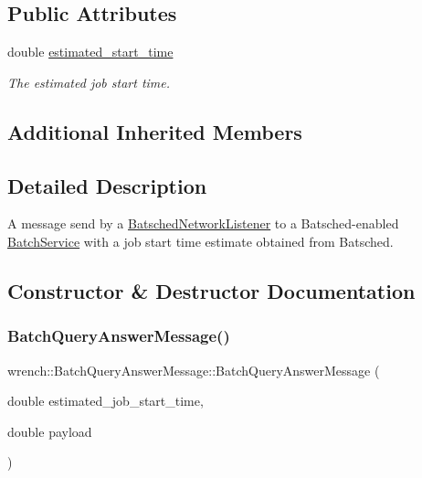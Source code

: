 \subsection*{Public Attributes}
\begin{DoxyCompactItemize}
\item 
\mbox{\label{classwrench_1_1_batch_query_answer_message_aca0da5540e9f1d5fdef6b16af7315d41}} 
double \hyperlink{classwrench_1_1_batch_query_answer_message_aca0da5540e9f1d5fdef6b16af7315d41}{estimated\+\_\+start\+\_\+time}
\begin{DoxyCompactList}\small\item\em The estimated job start time. \end{DoxyCompactList}\end{DoxyCompactItemize}
\subsection*{Additional Inherited Members}


\subsection{Detailed Description}
A message send by a \hyperlink{classwrench_1_1_batsched_network_listener}{Batsched\+Network\+Listener} to a Batsched-\/enabled \hyperlink{classwrench_1_1_batch_service}{Batch\+Service} with a job start time estimate obtained from Batsched. 

\subsection{Constructor \& Destructor Documentation}
\mbox{\label{classwrench_1_1_batch_query_answer_message_a10b010b2246f82e9ec6d2803a97b6597}} 
\subsubsection{\texorpdfstring{Batch\+Query\+Answer\+Message()}{BatchQueryAnswerMessage()}}
{\footnotesize\ttfamily wrench\+::\+Batch\+Query\+Answer\+Message\+::\+Batch\+Query\+Answer\+Message (\begin{DoxyParamCaption}\item[{double}]{estimated\+\_\+job\+\_\+start\+\_\+time,  }\item[{double}]{payload }\end{DoxyParamCaption})}



